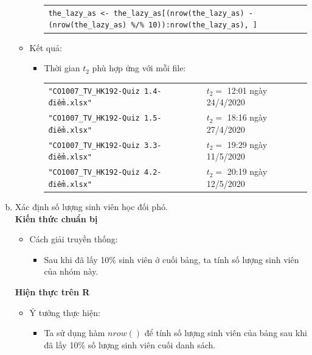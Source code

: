 \documentclass[a4paper]{article}
\theoremstyle{definition}
\begin{document}
\begin{enumerate}[a)]
\begin{itemize}
\begin{itemize}
\begin{center}
                \begin{tabular}{p{13cm}}
                    \texttt{the\_lazy\_as <- the\_lazy\_as[(nrow(the\_lazy\_as) - (nrow(the\_lazy\_as) \%/\% 10)):nrow(the\_lazy\_as), ]}
                \end{tabular}
            \end{center}
        \end{itemize}
        \item Kết quả:
        \begin{itemize}
            \item Thời gian $t_2$ phù hợp ứng với mỗi file:
            \begin{center}
                \begin{tabular}{l l}
                     \texttt{"CO1007\_TV\_HK192-Quiz 1.4-điểm.xlsx"} & $t_2 =$ 12:01 ngày 24/4/2020\\ 
                     \texttt{"CO1007\_TV\_HK192-Quiz 1.5-điểm.xlsx"} & $t_2 =$ 18:16 ngày 27/4/2020\\ 
                     \texttt{"CO1007\_TV\_HK192-Quiz 3.3-điểm.xlsx"} & $t_2 =$ 19:29 ngày 11/5/2020\\ 
                     \texttt{"CO1007\_TV\_HK192-Quiz 4.2-điểm.xlsx"} & $t_2 =$ 20:19 ngày 12/5/2020\\ 
                \end{tabular}
            \end{center}
        \end{itemize}
    \end{itemize}
    \bf \item Xác định số lượng sinh viên học đối phó.\\[6pt]
    \bf Kiến thức chuẩn bị\normalfont
    \begin{itemize}
        \item Cách giải truyền thống:
        \begin{itemize}
            \item Sau khi đã lấy 10\% sinh viên ở cuối bảng, ta tính số lượng sinh viên của nhóm này.
        \end{itemize}
    \end{itemize}
    \bf Hiện thực trên R\normalfont
    \begin{itemize}
        \item Ý tưởng thực hiện:
        \begin{itemize}
            \item Ta sử dụng hàm $nrow()$ để tính số lượng sinh viên của bảng sau khi đã lấy 10\% số lượng sinh viên cuối danh sách.

\end{itemize}
\end{itemize}
\end{enumerate}
\end{document}
